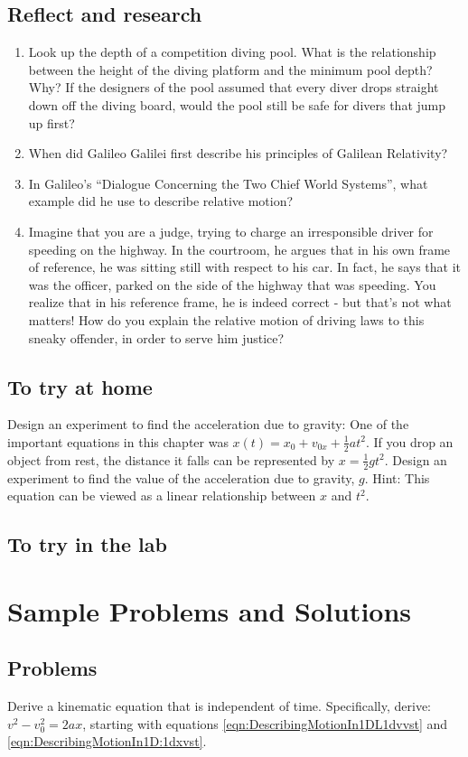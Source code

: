 \subsection{Reflect and research}
\begin{enumerate}
\item Look up the depth of a competition diving pool. What is the relationship between the height of the diving platform and the minimum pool depth? Why? If the designers of the pool assumed that every diver drops straight down off the diving board, would the pool still be safe for divers that jump up first?
\item When did Galileo Galilei first describe his principles of Galilean Relativity?
\item In Galileo's ``Dialogue Concerning the Two Chief World Systems'', what example did he use to describe relative motion?
\item Imagine that you are a judge, trying to charge an irresponsible driver for speeding on the highway. In the courtroom, he argues that in his own frame of reference, he was sitting still with respect to his car. In fact, he says that it was the officer, parked on the side of the highway that was speeding. You realize that in his reference frame, he is indeed correct - but that's not what matters! How do you explain the relative motion of driving laws to this sneaky offender, in order to serve him justice?
\end{enumerate}

\subsection{To try at home}
Design an experiment to find the acceleration due to gravity: One of the important equations in this chapter was $x(t)=x_0+v_{0x}+\frac{1}{2}at^2$. If you drop an object from rest, the distance it falls can be represented by $x=\frac{1}{2}gt^2$. Design an experiment to find the value of the acceleration due to gravity, $g$. Hint: This equation can be viewed as a linear relationship between $x$ and $t^2$. 
\subsection{To try in the lab}

\section{Sample Problems and Solutions}
\subsection{Problems}
\begin{problem}
Derive a kinematic equation that is independent of time. Specifically, derive: $v^2-v_0^2=2ax$, starting with equations \ref{eqn:DescribingMotionIn1DL1dvvst} and \ref{eqn:DescribingMotionIn1D:1dxvst}.  \label{prob:kinematicDerivation}
\end{problem}

